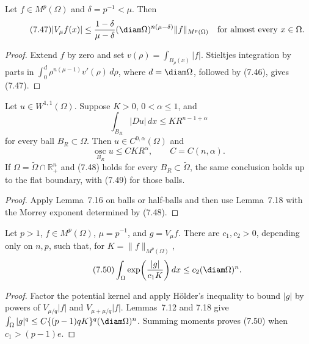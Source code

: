 \begin{lemma}
\label{gt:lem-sobolev-morrey-potential-bound}
Let $f\in M^p(\Omega)$ and $\delta=p^{-1}<\mu$. Then
\begin{equation}
\tag{7.47}
|V_\mu f(x)|\leq
\frac{1-\delta}{\mu-\delta}
(\diam\Omega)^{n(\mu-\delta)}\|f\|_{M^p(\Omega)}
\quad\text{for almost every }x\in\Omega.
\end{equation}
\end{lemma}
\begin{proof}
\sketch Extend $f$ by zero and set
$v(\rho)=\int_{B_\rho(x)}|f|$. Stieltjes integration by parts in
$\int_0^d\rho^{n(\mu-1)}v'(\rho)\,d\rho$, where
$d=\diam\Omega$, followed by (7.46), gives (7.47).
\end{proof}

\begin{theorem}
\label{gt:thm-sobolev-morrey-growth}
Let $u\in W^{1,1}(\Omega)$. Suppose $K>0$, $0<\alpha\leq1$, and
\begin{equation}
\tag{7.48}
\int_{B_R}|Du|\,dx\leq KR^{n-1+\alpha}
\end{equation}
for every ball $B_R\subset\Omega$. Then $u\in C^{0,\alpha}(\Omega)$ and
\begin{equation}
\tag{7.49}
\operatorname*{osc}_{B_R}u\leq C K R^\alpha,
\qquad C=C(n,\alpha).
\end{equation}
If $\Omega=\widetilde\Omega\cap\mathbb R_+^n$ and (7.48) holds for every
$B_R\subset\widetilde\Omega$, the same conclusion holds up to the flat
boundary, with (7.49) for those balls.
\end{theorem}
\begin{proof}
\sketch Apply Lemma~7.16 on balls or half-balls and then use Lemma~7.18 with
the Morrey exponent determined by (7.48).
\end{proof}

\begin{lemma}
\label{gt:lem-sobolev-morrey-potential-exponential}
Let $p>1$, $f\in M^p(\Omega)$, $\mu=p^{-1}$, and $g=V_\mu f$. There are
$c_1,c_2>0$, depending only on $n,p$, such that, for
$K=\|f\|_{M^p(\Omega)}$,
\begin{equation}
\tag{7.50}
\int_\Omega\exp\!\left(\frac{|g|}{c_1K}\right)dx
\leq c_2(\diam\Omega)^n.
\end{equation}
\end{lemma}
\begin{proof}
\sketch Factor the potential kernel and apply H\"older's inequality to bound $|g|$ by
powers of $V_{\mu/q}|f|$ and $V_{\mu+\mu/q}|f|$. Lemmas~7.12 and 7.18 give
$\int_\Omega|g|^q\leq C\{(p-1)qK\}^q(\diam\Omega)^n$. Summing moments proves
(7.50) when $c_1>(p-1)e$.
\end{proof}

